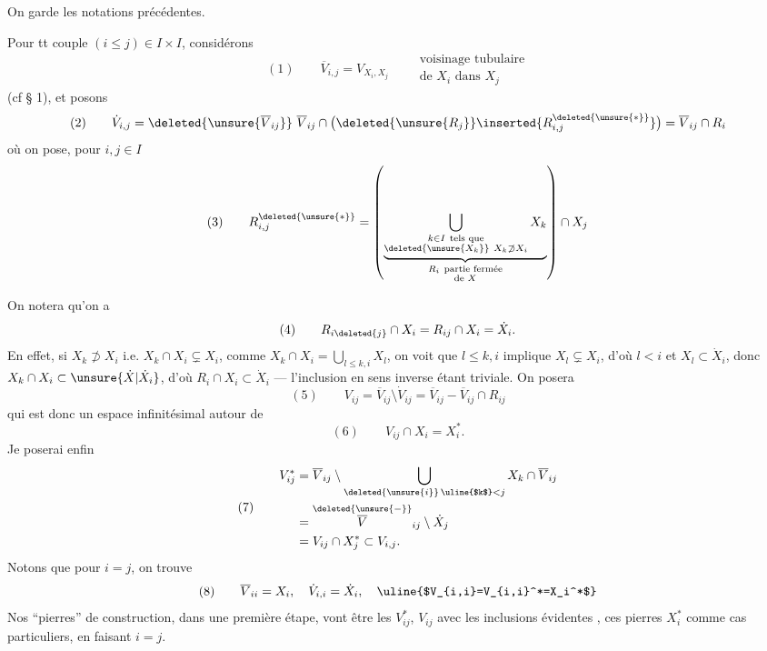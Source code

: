 On garde les notations précédentes.

Pour tt couple $(i\leq j)\in I\times I$, considérons
\[
(1)\qquad \overline V_{i,j}=V_{X_i,X_j}\qquad
\begin{gathered}\text{voisinage tubulaire}\\\text{de }X_i\text{ dans }X_j\end{gathered}
\]
(cf § 1), et posons
\[
(2)\qquad\dot V_{i,j}=\deleted{\unsure{\overline V_{ij}}}\ \overline V_{ij}\cap\bigl(\deleted{\unsure{R_j}}\inserted{R_{i,j}^{\deleted{\unsure{*}}}}\bigr)=\overline V_{ij}\cap R_i
\]
où on pose, pour $i,j\in I$
\[
(3)\qquad R_{i,j}^{\deleted{\unsure{*}}}=\left(
\underbrace{\bigcup_{\substack{k\in I\ \text{tels que}\\\deleted{\unsure{X_k}}\ X_k\not\supset X_i}}X_k}_{\substack{R_i\ \text{partie fermée}\\\text{de }X}}
\right)\cap X_j
\]


On notera qu'on a
\[
(4)\qquad R_{i\deleted{j}}\cap X_i=R_{ij}\cap X_i=\dot X_i.
\]
En effet, si $X_k\not\supset X_i$ i.e. $X_k\cap X_i\subsetneq X_i$, comme $X_k\cap X_i=\bigcup_{l\leq k,i}X_l$, on voit que  $l\leq k,i$ implique $X_l\subsetneq X_i$, d'où $l<i$ et $X_l\subset\dot X_i$, donc $X_k\cap X_i\subset\unsure{\dot X|\dot X_i}$, d'où $R_i\cap X_i\subset\dot X_i$ — l'inclusion en sens inverse étant triviale.
On posera 
\[
(5)\qquad V_{ij}=\overline V_{ij}\setminus\dot V_{ij}=\overline V_{ij}-\overline V_{ij}\cap R_{ij}
\]
qui est donc un espace infinitésimal autour de
\[
(6)\qquad V_{ij}\cap X_i=X_i^*.
\]
Je poserai enfin
\[
(7)\qquad\begin{aligned}
V_{ij}^*&=\overline V_{ij}\setminus\bigcup_{\deleted{\unsure{i}}\,\uline{$k$}<j}X_k\cap\overline V_{ij}\\
&=\overset{\deleted{\unsure{-}}}{\overline V}_{ij}\setminus\dot X_j\\
&=V_{ij}\cap X_j^*\subset V_{i,j}.
\end{aligned}
\]
Notons que pour $i=j$, on trouve
\[
(8)\qquad\overline V_{ii}=X_i,\quad\dot V_{i,i}=\dot X_i,\quad\uline{$V_{i,i}=V_{i,i}^*=X_i^*$}
\]
Nos ``pierres'' de construction, dans une première étape, vont être les $V_{ij}^*$, $V_{ij}$ avec les inclusions évidentes
,
ces pierres   $X_i^*$ comme
cas particuliers, en faisant $i=j$.

